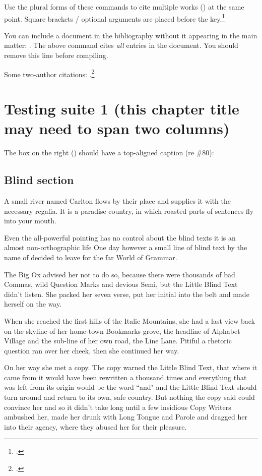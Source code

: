 \documentclass{grattan}
\begin{document}
Use the plural forms of these commands to cite multiple works (\textcites{Piketty2013}{Leigh-2013-BattlersBillionaires}) at the same point.
Square brackets / optional arguments are placed before the key.\footcites{AtkinsonStiglitz1976}[][42]{MirrleesAdamBesleyEtAl2011}


You can include a document in the bibliography without it appearing in the main matter: \nocite{*}.
The above command cites \emph{all} entries in the document. 
You should remove this line before compiling. 

Some two-author citations: \textcite{Norton2014Doubtfuldebtrising}.\footcites{DuckettBreadon-2014-Unlocking-skills}{Duckett-2016-Premium-policy-getting-more-from-PBS}{Norton2015Universityfeeswhat}{Norton2015cashnexushow}

\chapter{Testing suite 1 (this chapter title may need to span two columns)}\label{chap:test-1}
The box on the right () should have a top-aligned caption (re \#80):

\section{Blind section}
A small river named Carlton flows by their place and supplies it with the necessary regalia.
It is a paradise country, in which roasted parts of sentences fly into your mouth.

Even the all-powerful pointing has no control about the blind texts it is an almost non-orthographic life One day however a small line of blind text by the name of  decided to leave for the far World of Grammar.

The Big Ox advised her not to do so, because there were thousands of bad Commas, wild Question Marks and devious Semi, but the Little Blind Text didn't listen.
She packed her seven verse, put her initial into the belt and made herself on the way.

When she reached the first hills of the Italic Mountains, she had a last view back on the skyline of her home-town Bookmarks grove, the headline of Alphabet Village and the sub-line of her own road, the Line Lane.
Pitiful a rhetoric question ran over her cheek, then she continued her way.

On her way she met a copy.
The copy warned the Little Blind Text, that where it came from it would have been rewritten a thousand times and everything that was left from its origin would be the word ``and" and the Little Blind Text should turn around and return to its own, safe country.
But nothing the copy said could convince her and so it didn't take long until a few insidious Copy Writers ambushed her, made her drunk with Long Tongue and Parole and dragged her into their agency, where they abused her for their pleasure.
\end{document}
